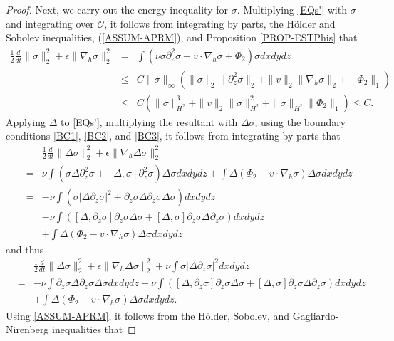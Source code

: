 \documentclass[10pt,a4paper]{amsart}
\begin{document}
\begin{proof}
Next, we carry out the energy inequality for $\sigma$. Multiplying \eqref{EQs'} with $\sigma$
and integrating over $\mathcal O$, it follows from integrating
by parts, the H\"older and Sobolev inequalities, (\ref{ASSUM-APRM}), and Proposition \ref{PROP-ESTPhis} that
\begin{eqnarray}
  \frac12\frac{d}{dt}\|\sigma\|_2^2+\epsilon\|\nabla_h\sigma\|_2^2
  &=&\int(\nu\sigma\partial_z^2\sigma-v\cdot\nabla_h\sigma+\Phi_2)\sigma dxdydz\nonumber \\
  &\leq& C\|\sigma\|_\infty(\|\sigma\|_2\|\partial_z^2\sigma\|_2+\|v\|_2\|\nabla_h\sigma\|_2+\|\Phi_2\|_1)\nonumber\\
  &\leq& C(\|\sigma\|_{H^2}^3+\|v\|_2\|\sigma\|_{H^2}^2+\|\sigma\|_{H^2}\|\Phi_2\|_1)\leq C. \label{EQ23}
\end{eqnarray}
Applying $\Delta$ to \eqref{EQs'}, multiplying the resultant with $\Delta\sigma$, using the boundary conditions \eqref{BC1}, \eqref{BC2}, and \eqref{BC3},
it follows from integrating by parts that
\begin{eqnarray*}
  &&\frac12\frac{d}{dt}\|\Delta\sigma\|_2^2+\epsilon\|\nabla_h\Delta\sigma\|_2^2 \nonumber\\
  &=&\nu\int(\sigma\Delta\partial_z^2\sigma+[\Delta,\sigma]\partial_z^2\sigma)\Delta\sigma dxdydz+\int\Delta(\Phi_2-v\cdot\nabla_h\sigma)\Delta\sigma dxdydz\nonumber\\
  &=&-\nu\int(\sigma|\Delta\partial_z\sigma|^2+\partial_z\sigma\Delta\partial_z\sigma\Delta\sigma)dxdydz\nonumber\\
  &&-\nu\int([\Delta,\partial_z\sigma]\partial_z\sigma\Delta\sigma+
  [\Delta,\sigma]\partial_z\sigma\Delta\partial_z\sigma) dxdydz\nonumber\\
  &&+\int\Delta(\Phi_2-v\cdot\nabla_h\sigma)\Delta\sigma dxdydz
\end{eqnarray*}
and thus
\begin{eqnarray}
  &&\frac12\frac{d}{dt}\|\Delta\sigma\|_2^2+\epsilon\|\nabla_h\Delta\sigma\|_2^2+\nu\int\sigma|\Delta\partial_z\sigma|^2dxdydz \nonumber\\
  &=&-\nu\int \partial_z\sigma\Delta\partial_z\sigma\Delta\sigma dxdydz
 -\nu\int([\Delta,\partial_z\sigma]\partial_z\sigma\Delta\sigma+
  [\Delta,\sigma]\partial_z\sigma\Delta\partial_z\sigma) dxdydz\nonumber\\
  &&+\int\Delta(\Phi_2-v\cdot\nabla_h\sigma)\Delta\sigma dxdydz.\label{EQ25}
\end{eqnarray}
Using \eqref{ASSUM-APRM}, it follows from the H\"older, Sobolev, and Gagliardo-Nirenberg inequalities that

\end{proof}
\end{document}
